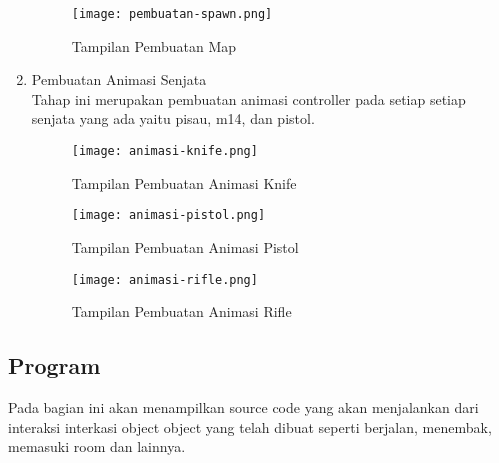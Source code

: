 \begin{enumerate}
\begin{figure}[h]
    \centering
    \texttt{[image: pembuatan-spawn.png]}
    \caption{Tampilan Pembuatan Map}
    \label{fig:pembuatanspawn}
\end{figure}
\item Pembuatan Animasi Senjata \\
Tahap ini merupakan pembuatan animasi controller pada setiap setiap senjata yang ada yaitu pisau, m14, dan pistol.
\begin{figure}[h]
    \centering
    \texttt{[image: animasi-knife.png]}
    \caption{Tampilan Pembuatan Animasi Knife}
    \label{fig:animasiknife}
\end{figure}
\newpage
\begin{figure}[h]
    \centering
    \texttt{[image: animasi-pistol.png]}
    \caption{Tampilan Pembuatan Animasi Pistol}
    \label{fig:animasipistol}
\end{figure}
\begin{figure}[h]
    \centering
    \texttt{[image: animasi-rifle.png]}
    \caption{Tampilan Pembuatan Animasi Rifle}
    \label{fig:animasirifle}
\end{figure}
\end{enumerate}

\newpage
\subsection{Program}
\noindent

Pada bagian ini akan menampilkan source code yang akan menjalankan dari interaksi interkasi object object yang telah dibuat seperti berjalan, menembak, memasuki room dan lainnya.

